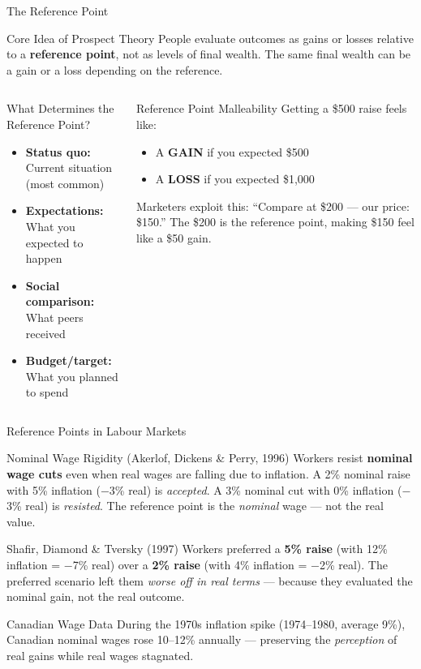 \documentclass[aspectratio=169]{beamer}
\begin{document}
\begin{frame}{The Reference Point}
\begin{block}{Core Idea of Prospect Theory}
People evaluate outcomes as \alert{gains or losses} relative to a \textbf{reference point}, not as levels of final wealth. The same final wealth can be a gain or a loss depending on the reference.
\end{block}
\begin{columns}
\begin{exampleblock}{What Determines the Reference Point?}
\begin{itemize}
  \item \textbf{Status quo:} Current situation (most common)
  \item \textbf{Expectations:} What you expected to happen
  \item \textbf{Social comparison:} What peers received
  \item \textbf{Budget/target:} What you planned to spend
\end{itemize}
\end{exampleblock}
\begin{alertblock}{Reference Point Malleability}
Getting a \$500 raise feels like:
\begin{itemize}
  \item A \textbf{GAIN} if you expected \$500
  \item A \textbf{LOSS} if you expected \$1,000
\end{itemize}
Marketers exploit this: ``Compare at \$200 --- our price: \$150.'' The \$200 is the reference point, making \$150 feel like a \$50 gain.
\end{alertblock}
\end{columns}
\end{frame}

\begin{frame}{Reference Points in Labour Markets}
\begin{block}{Nominal Wage Rigidity (Akerlof, Dickens \& Perry, 1996)}
Workers resist \textbf{nominal wage cuts} even when real wages are falling due to inflation. A 2\% nominal raise with 5\% inflation ($-$3\% real) is \textit{accepted}. A 3\% nominal cut with 0\% inflation ($-$3\% real) is \textit{resisted}. The reference point is the \textit{nominal} wage --- not the real value.
\end{block}
\begin{exampleblock}{Shafir, Diamond \& Tversky (1997)}
Workers preferred a \textbf{5\% raise} (with 12\% inflation = $-$7\% real) over a \textbf{2\% raise} (with 4\% inflation = $-$2\% real). The preferred scenario left them \textit{worse off in real terms} --- because they evaluated the nominal gain, not the real outcome.
\end{exampleblock}
\begin{alertblock}{Canadian Wage Data}
During the 1970s inflation spike (1974--1980, average 9\%), Canadian nominal wages rose 10--12\% annually --- preserving the \textit{perception} of real gains while real wages stagnated.
\end{alertblock}
\end{frame}
\end{document}
